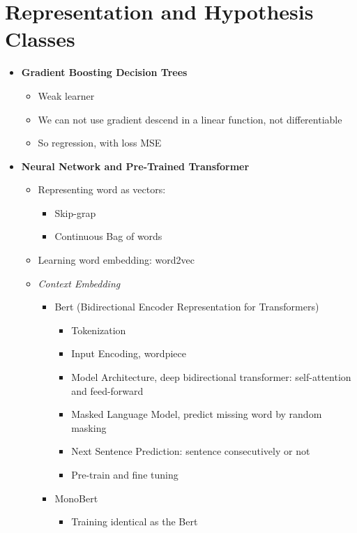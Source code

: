 \documentclass[12pt,oneside]{report}
\begin{document}
\chapter{Representation and Hypothesis Classes}
\begin{itemize}
    \item \textbf{Gradient Boosting Decision Trees}
    \begin{itemize}
        \item Weak learner
        \item We can not use gradient descend in a linear function, not differentiable
        \item So regression, with loss MSE
    \end{itemize}
    \item \textbf{Neural Network and Pre-Trained Transformer}
    \begin{itemize}
        \item Representing word as vectors:
        \begin{itemize}
            \item Skip-grap
            \item Continuous Bag of words
        \end{itemize}
        \item Learning word embedding: word2vec
        \item \textit{Context Embedding}
        \begin{itemize}
            \item Bert (Bidirectional Encoder Representation for Transformers)
            \begin{itemize}
                \item Tokenization
                \item Input Encoding, wordpiece
                \item Model Architecture, deep bidirectional transformer: self-attention and feed-forward
                \item Masked Language Model, predict missing word by random masking
                \item Next Sentence Prediction: sentence consecutively or not
                \item Pre-train and fine tuning
            \end{itemize}
            \item MonoBert
            \begin{itemize}
                \item Training identical as the Bert

\end{itemize}
\end{itemize}
\end{itemize}
\end{itemize}
\end{document}
